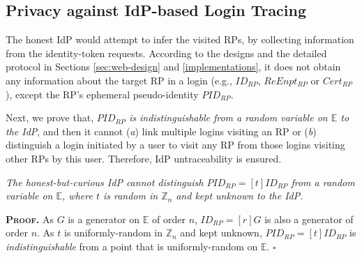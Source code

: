 \subsection{Privacy against IdP-based Login Tracing}
\label{subsec:IdP-privacy}

The honest IdP would attempt to infer the visited RPs,
by collecting information from the identity-token requests.
According to the designs and the detailed protocol in Sections \ref{sec:web-design} and \ref{implementations},
 it does not obtain any information about the target RP in a login (e.g., $ID_{RP}$, $ReEnpt_{RP}$ or $Cert_{RP}$), except the RP's ephemeral pseudo-identity $PID_{RP}$.

Next, we prove that, \emph{$PID_{RP}$ is indistinguishable from a random variable on $\mathbb{E}$ to the IdP},
    and then
 it cannot (\emph{a}) link multiple logins visiting an RP or (\emph{b}) distinguish a login initiated by a user to visit any RP from those logins visiting other RPs by this user. %
Therefore, IdP untraceability is ensured.


\vspace{1.5mm}
\begin{thm}
\emph{The honest-but-curious IdP cannot distinguish $PID_{RP} = [t]ID_{RP}$ from a random variable on $\mathbb{E}$, where $t$ is random in $\mathbb{Z}_n$ and kept unknown to the IdP.}\label{thm-idp-untraceability}
\end{thm}

\noindent\textbf{\textsc{Proof.}}
As $G$ is a generator on $\mathbb{E}$ of order $n$, $ID_{RP} = [r]G$ is also a generator of order $n$.
As $t$ is uniformly-random in $\mathbb{Z}_n$ and kept unknown, $PID_{RP} = [t]ID_{RP}$ is \emph{indistinguishable} from a point that is uniformly-random on $\mathbb{E}$.
\hfill $\square$

\vspace{1.5mm}


